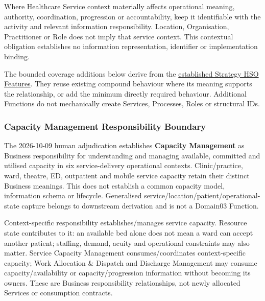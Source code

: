 Where Healthcare Service context materially affects operational meaning, authority, coordination, progression or accountability, keep it identifiable with the activity and relevant information responsibility. Location, Organisation, Practitioner or Role does not imply that service context. This contextual obligation establishes no information representation, identifier or implementation binding.

\label{rad:hso:14}

The bounded coverage additions below derive from the \hyperref[rad:enabling:443]{established Strategy HSO Features}. They reuse existing compound behaviour where its meaning supports the relationship, or add the minimum directly required behaviour. Additional Functions do not mechanically create Services, Processes, Roles or structural IDs.

\label{rad:hso:16}



\label{rad:hso:18}
\subsubsection*{Capacity Management Responsibility Boundary}
\label{rad:hso:20}

The 2026-10-09 human adjudication establishes \textbf{Capacity Management} as Business responsibility for understanding and managing available, committed and utilised capacity in six service-delivery operational contexts. Clinic/\allowbreak{}practice, ward, theatre, ED, outpatient and mobile service capacity retain their distinct Business meanings. This does not establish a common capacity model, information schema or lifecycle. Generalised service/\allowbreak{}location/\allowbreak{}patient/\allowbreak{}operational-state capture belongs to downstream derivation and is not a Domain03 Function.

\label{rad:hso:22}

Context-specific responsibility establishes/\allowbreak{}manages service capacity. Resource state contributes to it: an available bed alone does not mean a ward can accept another patient; staffing, demand, acuity and operational constraints may also matter. Service Capacity Management consumes/\allowbreak{}coordinates context-specific capacity; Work Allocation \& Dispatch and Discharge Management may consume capacity/\allowbreak{}availability or capacity/\allowbreak{}progression information without becoming its owners. These are Business responsibility relationships, not newly allocated Services or consumption contracts.

